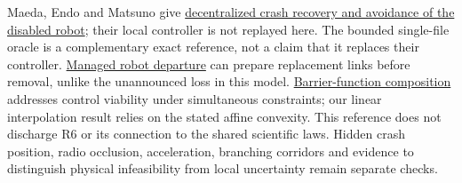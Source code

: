 \documentclass[11pt]{article}
\begin{document}
Maeda, Endo and Matsuno give
\href{https://doi.org/10.1016/j.jfranklin.2023.05.013}{decentralized
crash recovery and avoidance of the disabled robot}; their local
controller is not replayed here. The bounded single-file oracle is a
complementary exact reference, not a claim that it replaces their
controller. \href{https://arxiv.org/abs/2609.29939}{Managed robot
departure} can prepare replacement links before removal, unlike the
unannounced loss in this model.
\href{https://arxiv.org/abs/2210.01354}{Barrier-function composition}
addresses control viability under simultaneous constraints; our
linear interpolation result relies on the stated affine convexity.
This reference does not discharge R6 or its connection to the shared
scientific laws. Hidden crash position, radio occlusion, acceleration,
branching corridors and evidence to distinguish physical infeasibility
from local uncertainty remain separate checks.
\end{document}
